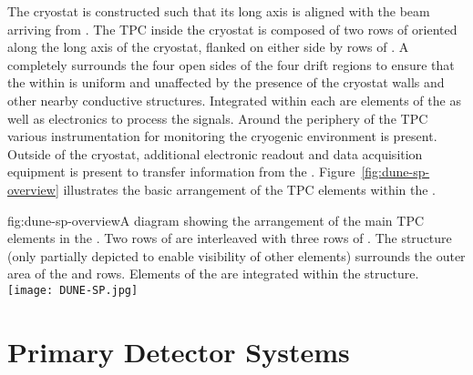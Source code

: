The cryostat is constructed such that its long axis is aligned with the beam arriving from \fnal.  The TPC  inside the cryostat is composed of two rows of  oriented along the long axis of the cryostat, flanked on either side by rows of .  A  completely surrounds the four
open sides of the four drift regions to ensure that the \efield within is uniform and unaffected by the presence of the cryostat walls and other nearby conductive structures.  Integrated within each  are elements of the  as well as electronics to process the  signals.  Around the periphery of the TPC various instrumentation for monitoring the cryogenic environment is present.  Outside of the cryostat, additional electronic readout and data acquisition equipment is present to transfer information from the .  Figure~\ref{fig:dune-sp-overview} illustrates the basic arrangement of the TPC elements within the .

\begin{dunefigure}{fig:dune-sp-overview}{A diagram showing the arrangement of the main TPC elements in the .  Two rows of  are interleaved with three rows of .  The  structure (only partially depicted to enable visibility of other elements) surrounds the outer area of the  and  rows.  Elements of the  are integrated within the  structure.}
\texttt{[image: DUNE-SP.jpg]}
\end{dunefigure}



\section{Primary Detector Systems}
\label{sec:fdsp-ov-sys}


 
